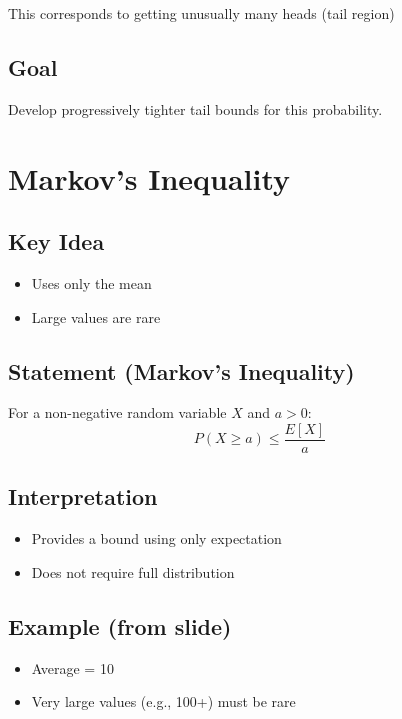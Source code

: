 \documentclass{article}
\begin{document}
This corresponds to getting unusually many heads (tail region)

\subsection{Goal}

Develop progressively tighter tail bounds for this probability.

\section{Markov’s Inequality}

\subsection{Key Idea}

\begin{itemize}
    \item Uses only the mean
    \item Large values are rare
\end{itemize}

\subsection{Statement (Markov’s Inequality)}

For a non-negative random variable $X$ and $a > 0$:
\begin{equation}
P(X \geq a) \leq \frac{E[X]}{a}
\end{equation}

\subsection{Interpretation}

\begin{itemize}
    \item Provides a bound using only expectation
    \item Does not require full distribution
\end{itemize}

\subsection{Example (from slide)}

\begin{itemize}
    \item Average = 10
    \item Very large values (e.g., 100+) must be rare
\end{itemize}
\end{document}
